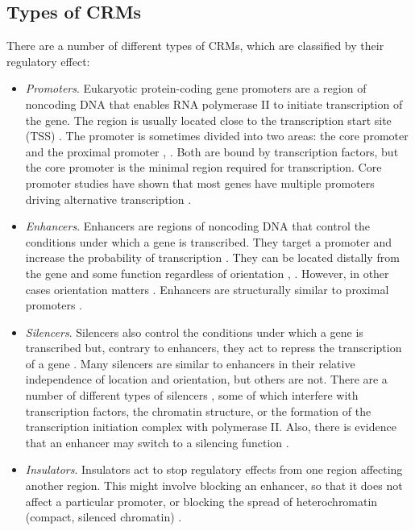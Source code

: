 \documentclass{frontiersENG} %
\begin{document}
\subsection{Types of CRMs}
\label{section:crmtypes}
There are a number of different types of CRMs, which are classified by
their regulatory effect:
\begin{itemize}
\item{\textit{Promoters}. Eukaryotic protein-coding gene promoters are
  a region of noncoding DNA that enables RNA polymerase II to initiate
  transcription of the gene. The region is usually located close to
  the transcription start site (TSS) \cite{Taher2013}. The promoter is
  sometimes divided into two areas: the core promoter and the proximal
  promoter \cite{Taher2013}, \cite{Butler2002}. Both are bound by
  transcription factors, but the core promoter is the minimal region
  required for transcription. Core promoter studies have shown that
  most genes have multiple promoters driving alternative transcription
  \cite{Sandelin2007}. }

\item{\textit{Enhancers}. Enhancers are regions of noncoding DNA that
  control the conditions under which a gene is transcribed. They
  target a promoter and increase the probability of transcription
  \cite{Walters1995}. They can be located distally from the gene and
  some function regardless of orientation \cite{Blackwood1998},
  \cite{Laimins1984}. However, in other cases orientation matters
  \cite{Hozumi2013}. Enhancers are structurally similar to proximal
  promoters \cite{Maston2006}.}

\item{\textit{Silencers}. Silencers also control the conditions under
  which a gene is transcribed but, contrary to enhancers, they act to
  repress the transcription of a gene \cite{Ogbourne1998}. Many
  silencers are similar to enhancers in their relative independence of
  location and orientation, but others are not. There are a number of
  different types of silencers \cite{Ogbourne1998}, some of which
  interfere with transcription factors, the chromatin structure, or
  the formation of the transcription initiation complex with
  polymerase II. Also, there is evidence that an enhancer may switch
  to a silencing function \cite{Jing2008}.}

\item{\textit{Insulators}. Insulators act to stop regulatory effects
  from one region affecting another region. This might involve
  blocking an enhancer, so that it does not affect a particular
  promoter, or blocking the spread of heterochromatin (compact,
  silenced chromatin) \cite{Ghirlando2012}.}
\end{itemize}
\end{document}
